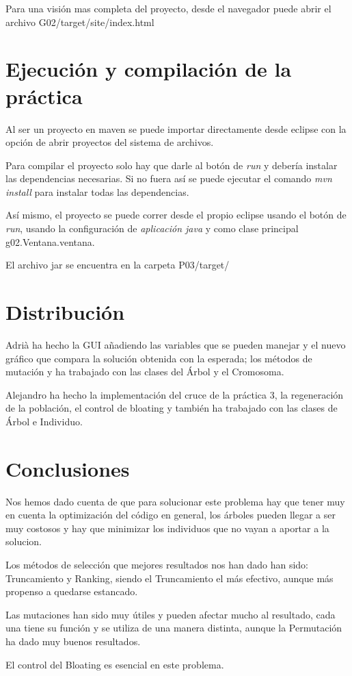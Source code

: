 \documentclass[twoside]{AiTeX}
\begin{document}
Para una visión mas completa del proyecto, desde el navegador puede abrir el archivo G02/target/site/index.html

\section{Ejecución y compilación de la práctica}

Al ser un proyecto en maven se puede importar directamente desde eclipse con la opción de abrir proyectos del sistema de archivos.

Para compilar el proyecto solo hay que darle al botón de \textit{run} y debería instalar las dependencias necesarias. Si no fuera así se puede ejecutar el comando \textit{mvn install} para instalar todas las dependencias.

Así mismo, el proyecto se puede correr desde el propio eclipse usando el botón de \textit{run}, usando la configuración de \textit{aplicación java} y como clase principal g02.Ventana.ventana.

El archivo jar se encuentra en la carpeta P03/target/



\section{Distribución}

Adrià ha hecho la GUI añadiendo las variables que se pueden manejar y el nuevo gráfico que compara la solución obtenida con la esperada; los métodos de mutación y ha trabajado con las clases del Árbol y el Cromosoma.

Alejandro ha hecho la implementación del cruce de la práctica 3, la regeneración de la población, el control de bloating y también ha trabajado con las clases de Árbol e Individuo.

\section{Conclusiones}

Nos hemos dado cuenta de que para solucionar este problema hay que tener muy en cuenta la optimización del código en general, los árboles pueden llegar a ser muy costosos y hay que minimizar los individuos que no vayan a aportar a la solucion.

Los métodos de selección que mejores resultados nos han dado han sido: Truncamiento y Ranking, siendo el Truncamiento el más efectivo, aunque más propenso a quedarse estancado.

Las mutaciones han sido muy útiles y pueden afectar mucho al resultado, cada una tiene su función y se utiliza de una manera distinta, aunque la Permutación ha dado muy buenos resultados.

El control del Bloating es esencial en este problema.
\end{document}

